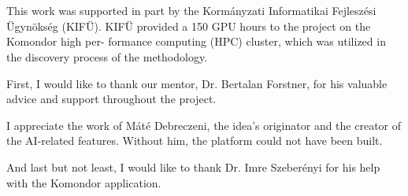 \chapter*{\koszonetnyilvanitas}


This work was supported in part by the Kormányzati Informatikai Fejleszési Ügynökség (KIFÜ). KIFÜ provided a 150 GPU hours to the project on the Komondor high per- formance computing (HPC) cluster, which was utilized in the discovery process of the  methodology.

First, I would like to thank our mentor, Dr. Bertalan Forstner, for his valuable advice and support throughout the project.

I appreciate the work of Máté Debreczeni, the idea's originator and the creator of the AI-related features. Without him, the platform could not have been built.

And last but not least, I would like to thank Dr. Imre Szeberényi for his help with the Komondor application.